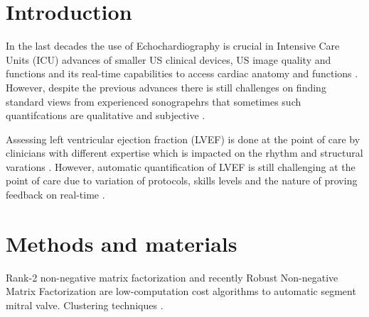\section{Introduction}
\label{sec:intro}
In the last decades the use of Echochardiography is crucial in Intensive Care Units (ICU) advances of smaller US clinical devices, US image quality and functions and its real-time  capabilities to access cardiac anatomy and functions \cite{Feigenbaum1996, Vieillard-Baron2008, singh2007, cambell2018}.
However, despite the previous advances there is still challenges on finding standard views from experienced sonograpehrs that sometimes  such quantifcations are qualitative and subjective \cite{Feigenbaum1996}.

Assessing left ventricular ejection fraction (LVEF) is done at the point of care by clinicians with different expertise which is impacted on the rhythm and structural varations \cite{liu2021}.
However, automatic quantification of LVEF is still challenging at the point of care due to variation of protocols, skills levels \cite{field2011} and the nature of proving feedback on real-time \cite{liu2021}.

\section{Methods and materials}
Rank-2 non-negative matrix factorization \cite{yuan2017} and recently Robust Non-negative Matrix Factorization
\cite{dukler2018} are low-computation cost algorithms to automatic segment mitral valve.
Clustering techniques \cite{zhang2018} \cite{kusunose2021}.

